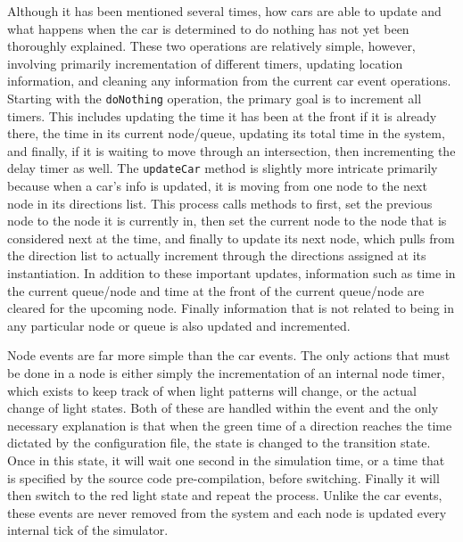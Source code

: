 Although it has been mentioned several times, how cars are able to update and what happens when the car is determined to do nothing has not yet been thoroughly explained.  These two operations are relatively simple, however, involving primarily incrementation of different timers, updating location information, and cleaning any information from the current car event operations.  Starting with the \texttt{doNothing} operation, the primary goal is to increment all timers.  This includes updating the time it has been at the front if it is already there, the time in its current node/queue, updating its total time in the system, and finally, if it is waiting to move through an intersection, then incrementing the delay timer as well.  The \texttt{updateCar} method is slightly more intricate primarily because when a car's info is updated, it is moving from one node to the next node in its directions list.  This process calls methods to first, set the previous node to the node it is currently in, then set the current node to the node that is considered next at the time, and finally to update its next node, which pulls from the direction list to actually increment through the directions assigned at its instantiation.  In addition to these important updates, information such as time in the current queue/node and time at the front of the current queue/node are cleared for the upcoming node.  Finally information that is not related to being in any particular node or queue is also updated and incremented.

Node events are far more simple than the car events.  The only actions that must be done in a node is either simply the incrementation of an internal node timer, which exists to keep track of when light patterns will change, or the actual change of light states.  Both of these are handled within the event and the only necessary explanation is that when the green time of a direction reaches the time dictated by the configuration file, the state is changed to the transition state.  Once in this state, it will wait one second in the simulation time, or a time that is specified by the source code pre-compilation, before switching.  Finally it will then switch to the red light state and repeat the process.  Unlike the car events, these events are never removed from the system and each node is updated every internal tick of the simulator.

